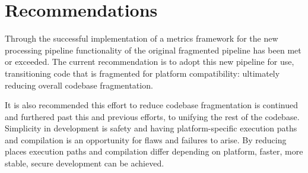 \section{Recommendations}

Through the successful implementation of a metrics framework for the new
processing \gls{pipeline} functionality of the original fragmented
\gls{pipeline} has been met or exceeded. The current recommendation is to adopt
this new \gls{pipeline} for use, transitioning code that is fragmented for
platform compatibility: ultimately reducing overall codebase
fragmentation.

It is also recommended this effort to reduce codebase fragmentation is continued
and furthered past this and previous efforts, to unifying the rest of
the codebase.  Simplicity in development is safety and having platform-specific
execution paths and compilation is an opportunity for flaws and failures to
arise. By reducing places execution paths and compilation differ depending on
platform, faster, more stable, secure development can be achieved.
